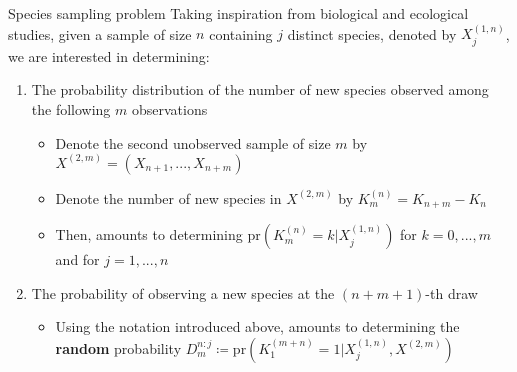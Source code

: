 \documentclass[11pt, handout]{beamer}
\newcommand{\circled}[1]{%
  \scalebox{0.6}{\tikz\node%
    [outer sep=0pt, inner sep=2pt,
      line width=0pt,text=white,fill=blue!50,draw,circle,shading=ball]{#1};%
  }%
}
\newcommand{\bref}[1]{\circled{\ref{#1}}}
\newcommand\Fontvi{\fontsize{10}{12}\selectfont}
\begin{document}
\begin{frame}{Species sampling problem}
    \Fontvi{}
    Taking inspiration from biological and ecological studies, given a sample of size \(n\) containing \(j\) distinct species, denoted by \(X_j^{(1,n)}\), we are interested in determining:
    \begin{enumerate}
        \item\label{item:one} The probability distribution of the number of new species observed among the following \(m\) observations
        \begin{itemize}
            \item Denote the second unobserved sample of size \(m\) by \(X^{(2, m)} = (X_{n+1},...,X_{n+m})\)
            \item Denote the number of new species in \(X^{(2, m)}\) by \(K_m^{(n)} = K_{n + m} - K_n\)
            \item Then, \bref{item:one} amounts to determining \(\text{pr}(K_m^{(n)} = k | X_j^{(1,n)})\) for \(k = 0,...,m\) and for \(j = 1,...,n\) %
        \end{itemize}
        \item\label{item:two} The probability of observing a new species at the \((n + m + 1)\)-th draw
        \begin{itemize}
            \item Using the notation introduced above, \bref{item:two} amounts to determining the \textbf{random} probability \(D_m^{n:j} \coloneqq \text{pr}(K_1^{(m + n)} = 1 | X_j^{(1,n)}, X^{(2, m)})\) %
        \end{itemize}
    \end{enumerate}
\end{frame}
\end{document}
